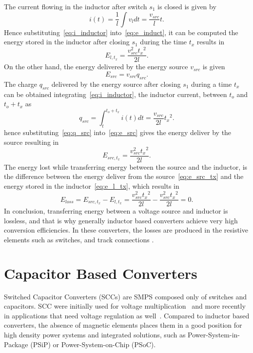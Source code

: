 The current flowing in the inductor after switch $s_1$ is closed is given by
\begin{equation}
i(t)= \frac{1}{l} \int v_l dt = \frac{v_{src}}{l}t.
\label{eq:i_inductor}
\end{equation}
Hence substituting~\eqref{eq:i_inductor} into~\eqref{eq:e_induct}, it can be computed the energy stored in the inductor after closing $s_1$ during the time $t_x$ results in
\begin{equation}
E_{l,t_x}= \frac{v_{src}^2{t_x}^2}{2l} .
\label{eq:e_l_tx}
\end{equation} 
On the other hand, the energy delivered by the energy source $v_{src}$ is given 
\begin{equation}
E_{src} = v_{src} q_{src}.
\label{eq:e_src}
\end{equation}
The charge $q_{src}$ delivered by the energy source after closing $s_1$ during a time $t_x$ can be obtained integrating~\eqref{eq:i_inductor}, the inductor current,  between $t_o$ and $t_o+t_x$ as
\begin{equation}
q_{src} = \int_t^{t_o+t_x} i(t) dt = \frac{v_{src}}{2l}{t_x}^2 .
\label{eq:q_src}
\end{equation}
hence substituting~\eqref{eq:q_src} into~\eqref{eq:e_src} gives the energy deliver by the source resulting in
\begin{equation}
E_{src,t_x} = \frac{v_{src}^2{t_x}^2}{2l}.
\label{eq:e_src_tx}
\end{equation}
The energy lost while transferring energy between the source and the inductor, is the difference between the energy deliver from the source~\eqref{eq:e_src_tx} and the energy stored in the inductor~\eqref{eq:e_l_tx}, which results in
\begin{equation}
E_{loss} = E_{src,t_x} - E_{l,t_x} = \frac{v_{src}^2{t_x}^2}{2l} - \frac{v_{src}^2{t_x}^2}{2l} =0.
\label{eq:e_loss_l}
\end{equation}
In conclusion, transferring energy between a voltage source and inductor is lossless, and that is why generally inductor based converters achieve very high conversion efficiencies. In these converters, the losses are produced in the resistive elements such as switches, and track connections .

\section{Capacitor Based Converters }
Switched Capacitor Converters (SCCs) are SMPS composed only of switches and capacitors. SCC were initially used for voltage multiplication~\cite{30Cockcroft,44Waidelich,76Dickson} and more recently in applications that need voltage regulation as well~\cite{Ng:EECS-2011-94}. Compared to inductor based converters, the absence of magnetic elements places them in a good position for high density power systems and integrated solutions, such as Power-System-in-Package (PSiP) or Power-System-on-Chip (PSoC).

